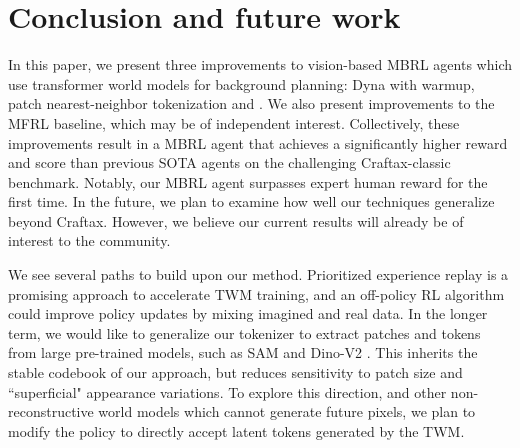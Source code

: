\section{Conclusion and future work}
In this paper, we present three
improvements to vision-based MBRL agents which use transformer
world models for background planning: Dyna with warmup,
patch nearest-neighbor tokenization and \btf. 
We also present improvements to the MFRL baseline, which may be of independent interest.
Collectively, these improvements result in a MBRL agent that achieves a significantly higher reward and score than previous SOTA agents on the challenging Craftax-classic benchmark. 
Notably, our MBRL agent surpasses expert human reward for the first time.
In the future, we plan to examine how well our techniques generalize
beyond Craftax.
However, we believe our current results will already be of interest to the community.


We see several paths to build upon our method.
Prioritized experience replay is a promising approach to accelerate TWM training, and an off-policy RL algorithm could improve policy updates by mixing imagined and real data.
In the longer term, we would like to generalize our tokenizer to extract
patches and tokens from large pre-trained models,
such as SAM \citep{ravi2024sam} and Dino-V2 \citep{Oquab2024}.
This inherits the stable codebook of our approach, but reduces sensitivity to patch size and ``superficial" appearance variations.
To explore this direction, and other non-reconstructive world models which cannot generate future pixels,  we plan to modify the policy to directly accept latent tokens generated by the TWM.








